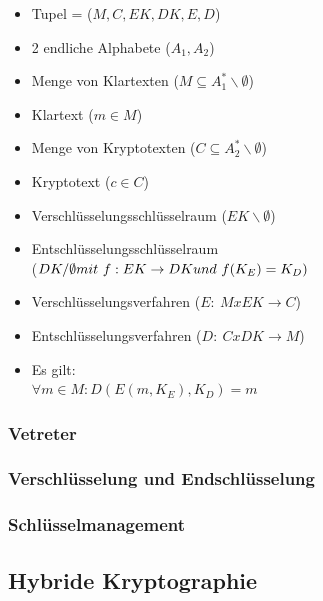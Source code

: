 \documentclass[paper=a4,11pt,german]{scrartcl} %
\begin{document}
\begin{minipage}[t]{0.45\linewidth}
\centering
\begin{itemize}
\item Tupel = ($M,C,EK,DK,E,D$)
\item 2 endliche Alphabete ($A_1,A_2$)
\item Menge von Klartexten ($M \subseteq A^*_1\backslash\emptyset$)
\item Klartext ($m \in M$)
\item Menge von Kryptotexten ($C \subseteq A^*_2\backslash\emptyset$)
\item Kryptotext ($c \in C$)
\item Verschlüsselungsschlüsselraum ($EK\backslash\emptyset$)
\end{itemize}
\end{minipage}
\begin{minipage}[t]{0.45\linewidth}
\begin{itemize}
\item Entschlüsselungsschlüsselraum\\
($DK/\emptyset \\mit~ f:EK \rightarrow DK \\und~ f(K_E)=K_D)$
\item Verschlüsselungsverfahren ($E :~ M x EK \rightarrow C$)
\item Entschlüsselungsverfahren ($D :~ C x DK \rightarrow M$)
\item Es gilt: \\ $\forall m \in M : D(E(m,K_E),K_D) = m$

\end{itemize}
\end{minipage}

\subsubsection{Vetreter}
\subsubsection{Verschlüsselung und Endschlüsselung}
\subsubsection{Schlüsselmanagement}
\subsection{Hybride Kryptographie}
\end{document}

